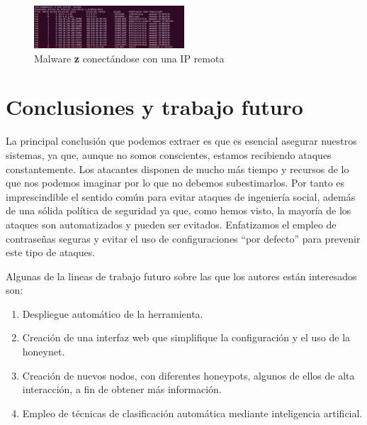 \documentclass[journal]{IEEEtran}
\begin{document}
\begin{figure}
\centering
\includegraphics[width=0.5\textwidth]{img/netstat}
\caption{Malware {\bf z} conectándose con una IP remota}
\label{fig:netstat}
\end{figure}


\section{Conclusiones y trabajo futuro}

La principal conclusión que podemos extraer es que es esencial asegurar nuestros sistemas, ya que, aunque no somos conscientes, estamos recibiendo ataques constantemente. Los atacantes disponen de mucho más tiempo y recursos de lo que nos podemos imaginar por lo que no debemos subestimarlos. Por tanto es imprescindible el sentido común para evitar ataques de ingeniería social, además de una sólida política de seguridad ya que, como hemos visto, la mayoría de los ataques son automatizados y pueden ser evitados. Enfatizamos el empleo de contraseñas seguras y evitar el uso de configuraciones “por defecto” para prevenir este tipo de ataques.

Algunas de la lineas de trabajo futuro sobre las que los autores están interesados son:

\begin{enumerate}
\item Despliegue automático de la herramienta.
\item Creación de una interfaz web que simplifique la configuración y el uso de la honeynet.
\item Creación de nuevos nodos, con diferentes honeypots, algunos de ellos de alta interacción, a fin de obtener más información.
\item Empleo de técnicas de clasificación automática mediante inteligencia artificial.
\end{enumerate}

\ifCLASSOPTIONcaptionsoff
  \newpage
\fi
\end{document}
